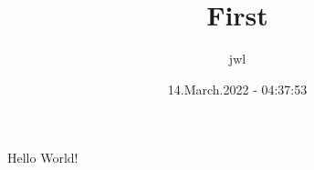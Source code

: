 \documentclass{article}
\title{First}
\date{14.March.2022 - 04:37:53}
\author{jwl}
\begin{document}
	\maketitle
	\newpage
	
	Hello World!
	
\end{document}
